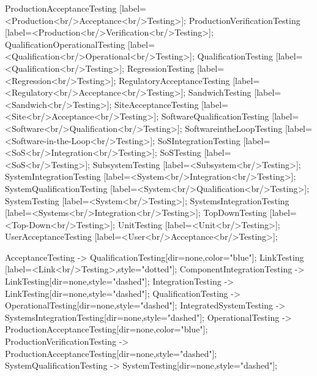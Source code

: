 \documentclass{article}
\begin{document}
{ProductionAcceptanceTesting [label=<Production<br/>Acceptance<br/>Testing>];
ProductionVerificationTesting [label=<Production<br/>Verification<br/>Testing>];
QualificationOperationalTesting [label=<Qualification<br/>Operational<br/>Testing>];
QualificationTesting [label=<Qualification<br/>Testing>];
RegressionTesting [label=<Regression<br/>Testing>];
RegulatoryAcceptanceTesting [label=<Regulatory<br/>Acceptance<br/>Testing>];
SandwichTesting [label=<Sandwich<br/>Testing>];
SiteAcceptanceTesting [label=<Site<br/>Acceptance<br/>Testing>];
SoftwareQualificationTesting [label=<Software<br/>Qualification<br/>Testing>];
SoftwareintheLoopTesting [label=<Software-in-the-Loop<br/>Testing>];
SoSIntegrationTesting [label=<SoS<br/>Integration<br/>Testing>];
SoSTesting [label=<SoS<br/>Testing>];
SubsystemTesting [label=<Subsystem<br/>Testing>];
SystemIntegrationTesting [label=<System<br/>Integration<br/>Testing>];
SystemQualificationTesting [label=<System<br/>Qualification<br/>Testing>];
SystemTesting [label=<System<br/>Testing>];
SystemsIntegrationTesting [label=<Systems<br/>Integration<br/>Testing>];
TopDownTesting [label=<Top-Down<br/>Testing>];
UnitTesting [label=<Unit<br/>Testing>];
UserAcceptanceTesting [label=<User<br/>Acceptance<br/>Testing>];

AcceptanceTesting -> QualificationTesting[dir=none,color="blue"];
LinkTesting [label=<Link<br/>Testing>,style="dotted"];
ComponentIntegrationTesting -> LinkTesting[dir=none,style="dashed"];
IntegrationTesting -> LinkTesting[dir=none,style="dashed"];
QualificationTesting -> OperationalTesting[dir=none,style="dashed"];
IntegratedSystemTesting -> SystemsIntegrationTesting[dir=none,style="dashed"];
OperationalTesting -> ProductionAcceptanceTesting[dir=none,color="blue"];
ProductionVerificationTesting -> ProductionAcceptanceTesting[dir=none,style="dashed"];
SystemQualificationTesting -> SystemTesting[dir=none,style="dashed"];

}
\end{document}

